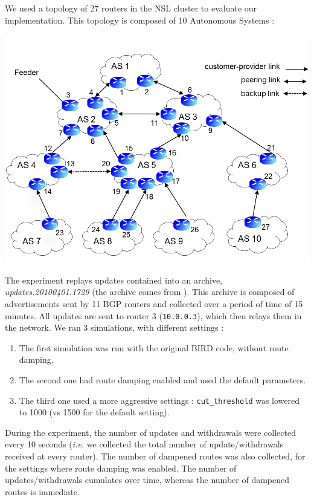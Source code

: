 \documentclass[a4paper,english]{IEEEtran}
\begin{document}
We used a topology of 27 routers in the NSL cluster to evaluate
our implementation.
This topology is composed of 10 Autonomous Systems :

\begin{center}
\includegraphics[scale=.3]{img/topology.png}
\end{center}

The experiment replays updates contained into an archive,
\textsl{updates.20100401.1729} (the archive comes from \cite{routeviews}).
This archive is composed of advertisements sent by 11 BGP routers and collected
over a period of time of 15 minutes.
All updates are sent to router 3 (\texttt{\small 10.0.0.3}), which then relays them
in the network.
We ran 3 simulations, with different settings :

\begin{enumerate}
\item The first simulation was run with the original BIRD code, without route damping.
\item The second one had route damping enabled and used the default parameters.
\item The third one used a more aggressive settings : \texttt{\small cut\_threshold} was lowered to 1000 (vs 1500 for the default setting).
\end{enumerate}

During the experiment, the number of updates and withdrawals were collected every 10 seconds (\textit{i.e.} we collected the total number of update/withdrawals received at every router).
The number of dampened routes was also collected, for the settings where route damping was enabled.
The number of updates/withdrawals cumulates over time, whereas the number of dampened routes is immediate.
\end{document}
